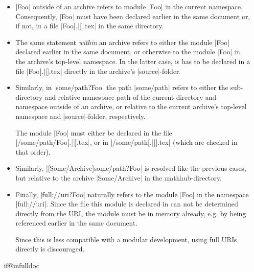 \begin{itemize}
   \item {}|{Foo}| outside of an archive refers 
     to module |Foo| in the current namespace. Consequently, |Foo|
     must have been declared earlier in the same document or, if not,
     in a file |Foo[.||].tex| in the same directory.
   \item The same statement \emph{within} an archive refers to either
     the module |Foo| declared earlier in the same document, or
     otherwise to the module |Foo| in the archive's top-level namespace.
     In the latter case, is has to be declared in a file |Foo[.||].tex|
     directly in the archive's |source|-folder.
   \item Similarly, in |{some/path?Foo}| the path
     |some/path| refers to either the sub-directory and relative 
     namespace path of the current directory and namespace outside of an archive,
     or relative to the current archive's top-level namespace and |source|-folder,
     respectively.

     The module |Foo| must either be declared in the file
     |/some/path/Foo[.||].tex|, or in
     |/some/path[.||].tex| (which are
     checked in that order).
   \item Similarly, |[Some/Archive]{some/path?Foo}|
     is resolved like the previous cases, but relative to the archive
     |Some/Archive| in the mathhub-directory.
   \item Finally, |{full://uri?Foo}| naturally refers to the
     module |Foo| in the namespace |full://uri|. Since the file this module
     is declared in can not be determined directly from the URI, the module
     must be in memory already, e.g. by being referenced earlier in the
     same document.

     Since this is less compatible with a modular development, using full
     URIs directly is discouraged.

 \end{itemize} 


	
	
\csname if@infulldoc\endcsname\else\fi
